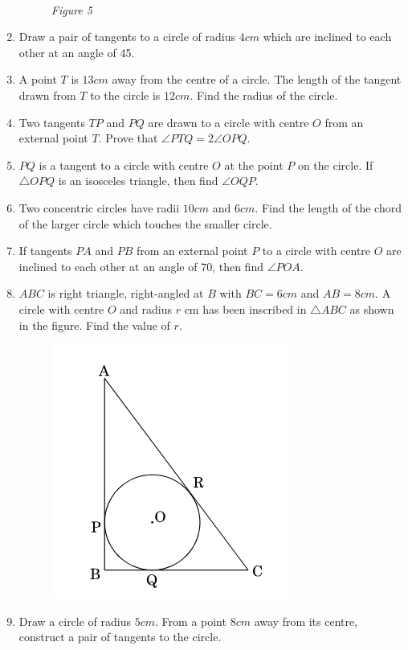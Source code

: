 \documentclass{article}
\begin{document}
\begin{enumerate}
\begin{figure}[!htb]
		\\
		\emph{Figure 5}
		\label{fig:my_label}
	\end{figure}
	\item Draw a pair of tangents to a circle of radius $4 cm$ which are inclined to each other at an angle of 45\textdegree.	
	\item A point $T$ is $13 cm$ away from the centre of a circle. The length of the tangent drawn from $T$ to the circle is $12 cm$. Find the radius of the circle.
	\item Two tangents $TP$ and $PQ$ are drawn to a circle with centre $O$ from an external point $T$. Prove that $\angle PTQ = 2 \angle OPQ$.
	\item $PQ$ is a tangent to a circle with centre $O$ at the point $P$ on the circle. If $\triangle OPQ$ is an isosceles triangle, then find $\angle OQP$.
	\item Two concentric circles have radii $10 cm$ and $6 cm$. Find the length of the chord of the larger circle which touches the smaller circle.
	\item If tangents $PA$ and $PB$ from an external point $P$ to a circle with centre $O$ are inclined to each other at an angle of 70\textdegree, then find $\angle POA$.
	\item $ABC$ is right triangle, right-angled at $B$ with $BC = 6 cm$ and $AB = 8 cm$. A circle with centre $O$ and radius $r$ cm has been inscribed in $\triangle ABC$ as shown in the figure. Find the value of $r$.
		\begin{figure}[H]
			\centering
			\includegraphics[scale=0.8]{fig2.png}
			\label{fig:my_label}
		\end{figure}
	\item Draw a circle of radius $5 cm$. From a point $8 cm$ away from its centre, construct a pair of tangents to the circle.

\end{enumerate}
\end{document}
